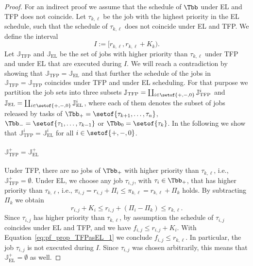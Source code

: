 \documentclass[conference]{IEEEtran}
\theoremstyle{definition}
\theoremstyle{remark}
\newcommand{\Jbb}{\mathbb{J}}
\DeclareMathOperator{\TFP}{TFP}
\DeclareMathOperator{\EL}{EL}
\begin{document}
\begin{proof}
	For an indirect proof we assume that the schedule of $\Tbb$ under EL and TFP does not coincide.
	Let $\tau_{k,\ell}$ be the job with the highest priority in the EL schedule, such that the schedule of $\tau_{k,\ell}$ does not coincide under EL and TFP.
	We define the interval 
	\begin{equation}
		I := [r_{k,\ell}, r_{k,\ell} + K_k).
	\end{equation}
	Let $\Jbb_{\TFP}$ and $\Jbb_{\EL}$ be the set of jobs with higher priority than $\tau_{k,\ell}$ under TFP and under EL that are executed during $I$.
	We will reach a contradiction by showing that $\Jbb_{\TFP}=\Jbb_{\EL}$ and that further the schedule of the jobs in $\Jbb_{\TFP}=\Jbb_{\TFP}$ coincides under TFP and under EL scheduling.
	For that purpose we partition the job sets into three subsets
	$\Jbb_{\TFP} = \coprod_{i \in \setof{+, -, 0}} \Jbb_{\TFP}^i$ and
	$\Jbb_{\EL} = \coprod_{i \in \setof{+, -, 0}} \Jbb_{\EL}^i$,
	where each of them denotes the subset of jobs released by tasks of $\Tbb_{+} = \setof{\tau_{k+1}, \dots, \tau_n}$, $\Tbb_{-} = \setof{\tau_1, \dots, \tau_{k-1}}$ or $\Tbb_{0} = \setof{\tau_k}$.
	In the following we show that $\Jbb_{\TFP}^i = \Jbb_{\EL}^i$ for all $i \in \setof{+,-,0}$.
	
	\paragraph{$\Jbb_{\TFP}^+ = \Jbb_{\EL}^+$}
	Under TFP, there are no jobs of $\Tbb_{+}$ with higher priority than $\tau_{k,\ell}$, i.e., $\Jbb_{\TFP}^+ = \emptyset$.
	Under EL, we choose any job $\tau_{i,j}$, with $\tau_i \in \Tbb_{+}$, that has higher priority than $\tau_{k,\ell}$, i.e., $\pi_{i,j}=r_{i,j} + \Pi_i \leq \pi_{k,\ell} = r_{k,\ell} + \Pi_k$ holds.
	By subtracting $\Pi_k$ we obtain
	\begin{equation}\label{eq:pf_prop_TFPasEL_1}
	 	r_{i,j} + K_i \leq r_{i,j} + (\Pi_i-\Pi_k) \leq r_{k,\ell}.
	\end{equation}
 	Since $\tau_{i,j}$ has higher priority than $\tau_{k,\ell}$, by assumption the schedule of $\tau_{i,j}$ coincides under EL and TFP, and we have $f_{i,j} \leq r_{i,j} + K_i$.
 	With Equation~\eqref{eq:pf_prop_TFPasEL_1} we conclude $f_{i,j} \leq r_{k,\ell}$.
 	In particular, the job $\tau_{i,j}$ is not executed during $I$.
 	Since $\tau_{i,j}$ was chosen arbitrarily, this means that $\Jbb_{\EL}^+ = \emptyset$ as well.
 	

\end{proof}
\end{document}
